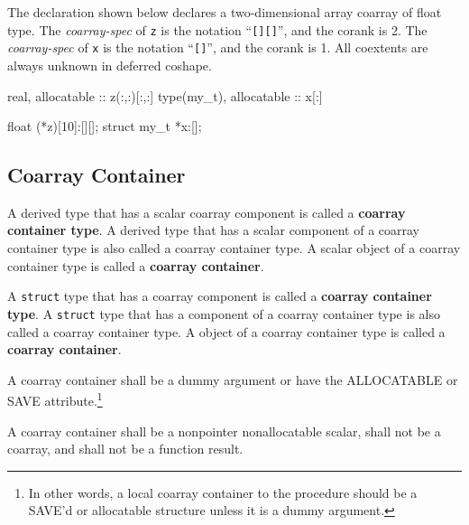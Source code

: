 {\onlyC} The declaration shown below declares a two-dimensional array
coarray of float type. 
The {\it coarray-spec} of {\tt z} is the notation ``{\tt [][]}'',
and the corank is 2.
The {\it coarray-spec} of {\tt x} is the notation ``{\tt []}'',
and the corank is 1.
All coextents are always unknown in deferred coshape.

\begin{center}
 \begin{minipage}{0.48\hsize}
  \begin{XFexample}
  real, allocatable :: z(:,:)[:,:]
  type(my_t), allocatable :: x[:]
  \end{XFexample}
 \end{minipage}
%
 \begin{minipage}{0.48\hsize}
  \begin{XCexampleR}
  float (*z)[10]:[][];
  struct my_t *x:[];
  \end{XCexampleR}
 \end{minipage}
\end{center}


\subsection{Coarray Container}
\label{sec:Coarray Container}

{\onlyF}
A derived type that has a scalar coarray component is called 
a {\bf coarray container type}.
A derived type that has a scalar component of a coarray container type 
is also called a coarray container type.
A scalar object of a coarray container type is called 
a {\bf coarray container}.

{\onlyC}
A {\tt struct} type that has a coarray component is called 
a {\bf coarray container type}.
A {\tt struct} type that has a component of a coarray container type 
is also called a coarray container type.
A object of a coarray container type is called 
a {\bf coarray container}.

\begin{Constraints F}
\item A coarray container shall be a dummy argument or have 
the ALLOCATABLE or SAVE attribute.\footnote
{In other words, a local coarray container to the procedure should be a SAVE'd or 
allocatable structure unless it is a dummy argument.}

\item A coarray container shall be a nonpointer nonallocatable scalar, 
shall not be a coarray, and shall not be a function result. 
\end{Constraints F}

